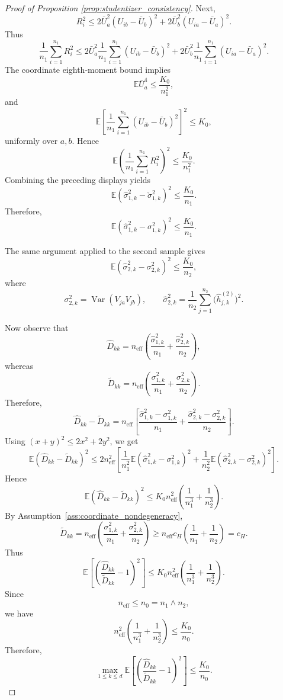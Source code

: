 \documentclass[
  12pt]{article}
\theoremstyle{plain}
\theoremstyle{definition}
\theoremstyle{remark}
\begin{document}
\begin{proof}[Proof of Proposition \ref{prop:studentizer_consistency}]
Next,
\[
R_i^2
\le
2\bar U_a^2(U_{ib}-\bar U_b)^2
+
2\bar U_b^2(U_{ia}-\bar U_a)^2.
\]
Thus
\[
\frac1{n_1}\sum_{i=1}^{n_1}R_i^2
\le
2\bar U_a^2
\frac1{n_1}\sum_{i=1}^{n_1}(U_{ib}-\bar U_b)^2
+
2\bar U_b^2
\frac1{n_1}\sum_{i=1}^{n_1}(U_{ia}-\bar U_a)^2.
\]
The coordinate eighth-moment bound implies
\[
\mathbb E\bar U_a^4\le \frac{K_0}{n_1^2},
\]
and
\[
\mathbb E
\left[
\frac1{n_1}\sum_{i=1}^{n_1}(U_{ib}-\bar U_b)^2
\right]^2
\le K_0,
\]
uniformly over \(a,b\). Hence
\[
\mathbb E
\left(
\frac1{n_1}\sum_{i=1}^{n_1}R_i^2
\right)^2
\le
\frac{K_0}{n_1^2}.
\]
Combining the preceding displays yields
\[
\mathbb E
\left(
\widehat\sigma_{1,k}^2-\check\sigma_{1,k}^2
\right)^2
\le
\frac{K_0}{n_1}.
\]
Therefore,
\[
\mathbb E
\left(
\widehat\sigma_{1,k}^2-\sigma_{1,k}^2
\right)^2
\le
\frac{K_0}{n_1}.
\]

The same argument applied to the second sample gives
\[
\mathbb E
\left(
\widehat\sigma_{2,k}^2-\sigma_{2,k}^2
\right)^2
\le
\frac{K_0}{n_2},
\]
where
\[
\sigma_{2,k}^2=\operatorname{Var}(V_{ja}V_{jb}),
\qquad
\widehat\sigma_{2,k}^2
=
\frac1{n_2}\sum_{j=1}^{n_2}
\bigl(\widehat h_{j,k}^{(2)}\bigr)^2.
\]

Now observe that
\[
\widehat D_{kk}
=
n_{\mathrm{eff}}
\left(
\frac{\widehat\sigma_{1,k}^2}{n_1}
+
\frac{\widehat\sigma_{2,k}^2}{n_2}
\right),
\]
whereas
\[
\widetilde D_{kk}
=
n_{\mathrm{eff}}
\left(
\frac{\sigma_{1,k}^2}{n_1}
+
\frac{\sigma_{2,k}^2}{n_2}
\right).
\]
Therefore,
\[
\widehat D_{kk}-\widetilde D_{kk}
=
n_{\mathrm{eff}}
\left[
\frac{\widehat\sigma_{1,k}^2-\sigma_{1,k}^2}{n_1}
+
\frac{\widehat\sigma_{2,k}^2-\sigma_{2,k}^2}{n_2}
\right].
\]
Using \((x+y)^2\le 2x^2+2y^2\), we get
\[
\mathbb E(\widehat D_{kk}-\widetilde D_{kk})^2
\le
2n_{\mathrm{eff}}^2
\left[
\frac1{n_1^2}
\mathbb E(\widehat\sigma_{1,k}^2-\sigma_{1,k}^2)^2
+
\frac1{n_2^2}
\mathbb E(\widehat\sigma_{2,k}^2-\sigma_{2,k}^2)^2
\right].
\]
Hence
\[
\mathbb E(\widehat D_{kk}-\widetilde D_{kk})^2
\le
K_0 n_{\mathrm{eff}}^2
\left(
\frac1{n_1^3}
+
\frac1{n_2^3}
\right).
\]
By Assumption~\ref{ass:coordinate_nondegeneracy},
\[
\widetilde D_{kk}
=
n_{\mathrm{eff}}
\left(
\frac{\sigma_{1,k}^2}{n_1}
+
\frac{\sigma_{2,k}^2}{n_2}
\right)
\ge
n_{\mathrm{eff}}c_H
\left(
\frac1{n_1}+\frac1{n_2}
\right)
=
c_H.
\]
Thus
\[
\mathbb E
\left[
\left(
\frac{\widehat D_{kk}}{\widetilde D_{kk}}-1
\right)^2
\right]
\le
K_0 n_{\mathrm{eff}}^2
\left(
\frac1{n_1^3}
+
\frac1{n_2^3}
\right).
\]
Since
\[
n_{\mathrm{eff}}\le n_0=n_1\wedge n_2,
\]
we have
\[
n_{\mathrm{eff}}^2
\left(
\frac1{n_1^3}
+
\frac1{n_2^3}
\right)
\le
\frac{K_0}{n_0}.
\]
Therefore,
\[
\max_{1\le k\le d}
\mathbb E
\left[
\left(
\frac{\widehat D_{kk}}{\widetilde D_{kk}}-1
\right)^2
\right]
\le
\frac{K_0}{n_0}.
\]


\end{proof}
\end{document}
